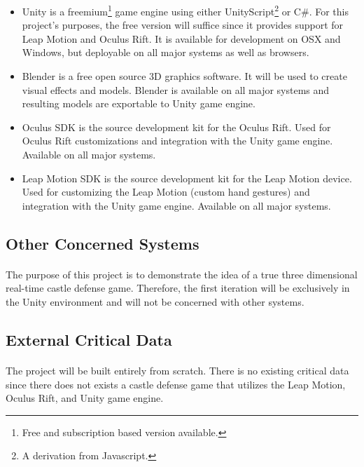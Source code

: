 \begin{itemize}
	\item Unity is a freemium\footnote{Free and subscription based version available.} game engine using either UnityScript\footnote{A derivation from Javascript.} or C\#. For this project's purposes, the free version will suffice since it provides support for Leap Motion and Oculus Rift. It is available for development on OSX and Windows, but deployable on all major systems as well as browsers.
	\item Blender is a free open source 3D graphics software. It will be used to create visual effects and models. Blender is available on all major systems and resulting models are exportable to Unity game engine.
	\item Oculus SDK is the source development kit for the Oculus Rift. Used for Oculus Rift customizations and integration with the Unity game engine. Available on all major systems.
	\item Leap Motion SDK is the source development kit for the Leap Motion device. Used for customizing the Leap Motion (custom hand gestures) and integration with the Unity game engine. Available on all major systems.
\end{itemize}

\subsection{Other Concerned Systems}

\paragraph{} The purpose of this project is to demonstrate the idea of a true three dimensional real-time castle defense game. Therefore, the first iteration will be exclusively in the Unity environment and will not be concerned with other systems.

\subsection{External Critical Data}

\paragraph{} The project will be built entirely from scratch. There is no existing critical data since there does not exists a castle defense game that utilizes the Leap Motion, Oculus Rift, and Unity game engine.

